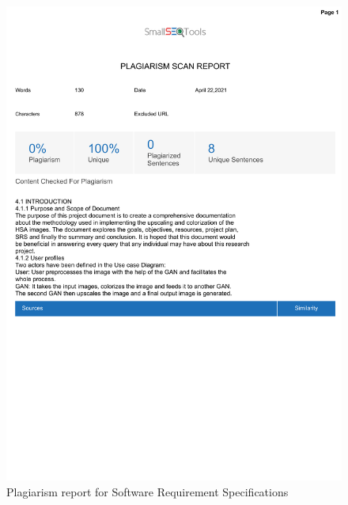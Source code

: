 \documentclass[oneside,a4paper,12pt]{report}
\begin{document}
\begin{appendices}
\begin{figure}
	\centering
    \includegraphics[width=\textwidth, height=\textheight]{plagiarism/software_requirement_specification.pdf}
    \caption{Plagiarism report for Software Requirement Specifications}
    \label{PlagiarismSRS}
\end{figure}


\end{appendices}
\end{document}
